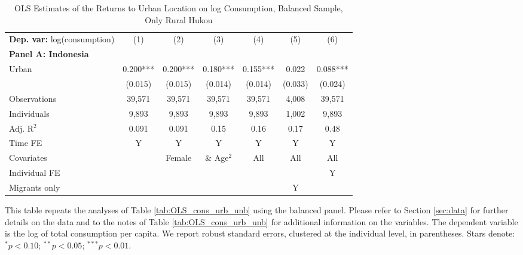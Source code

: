 \begin{table}[htbp] \centering \begin{threeparttable}
 \caption{OLS Estimates of the Returns to Urban Location on log Consumption, Balanced Sample, Only Rural Hukou} 
 \label{tab:OLS_CHN_hukou_rural_only_consumption_urban_bal} 
\begin{tabular}{l cccccc} \toprule  \textbf{Dep. var:}  log(consumption) 
                    &\multicolumn{1}{c}{(1)}   &\multicolumn{1}{c}{(2)}   &\multicolumn{1}{c}{(3)}   &\multicolumn{1}{c}{(4)}   &\multicolumn{1}{c}{(5)}   &\multicolumn{1}{c}{(6)}   \\
\textbf{Panel A: Indonesia} \\
Urban               &       0.200***&       0.200***&       0.180***&       0.155***&       0.022   &       0.088***\\
                    &     (0.015)   &     (0.015)   &     (0.014)   &     (0.014)   &     (0.033)   &     (0.024)   \\
\addlinespace
Observations        &      39,571   &      39,571   &      39,571   &      39,571   &       4,008   &      39,571   \\
Individuals         &       9,893   &       9,893   &       9,893   &       9,893   &       1,002   &       9,893   \\
Adj. R$^{2}$        &       0.091   &       0.091   &        0.15   &        0.16   &        0.17   &        0.48   \\
\cmidrule{2 -7} Time FE & Y & Y & Y & Y & Y & Y \\ Covariates & & Female & \& Age$^2$ & All & All & All \\ Individual FE & & & & & & Y \\ Migrants only & & & & & Y & \\ \bottomrule \end{tabular} \begin{tablenotes}[flushleft] \footnotesize \item{This table repeats the analyses of Table \ref{tab:OLS_cons_urb_unb}  using the balanced panel. Please refer to Section \ref{sec:data} for further details on the data and to the notes of Table \ref{tab:OLS_cons_urb_unb} for additional information on the variables. The dependent variable is the log of total consumption per capita. We report robust standard errors, clustered at the individual level, in parentheses. Stars denote: $^{*} p<0.10$; $^{**} p<0.05$; $^{***} p<0.01$.} \end{tablenotes} \end{threeparttable} \end{table}
